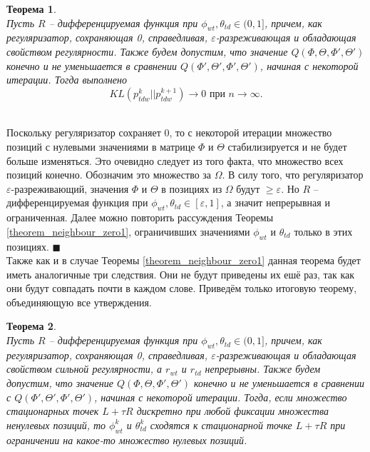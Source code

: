 \documentclass[12pt]{article}
\newtheorem{theorem}{Теорема}
\newenvironment{Proof} 
	{\par\noindent{\bf Доказательство.}} 
	{\hfill$\blacksquare$}
\renewcommand{\geq}{\geqslant}
\begin{document}
\begin{theorem} \label{theorem_neighbour_zero2} \ \\
	Пусть $R$ -- дифференцируемая функция при $\phi_{wt}, \theta_{td} \in (0, 1]$, причем, как регуляризатор, сохраняющая 0, справедливая, $\varepsilon$-разреживающая и обладающая свойством регулярности. Также будем допустим,  что значение $Q(\Phi, \Theta, \Phi', \Theta')$ конечно и не уменьшается в сравнении $Q(\Phi', \Theta', \Phi', \Theta')$, начиная с некоторой итерации. Тогда выполнено
\[
KL(p_{tdw}^{k}||p_{tdw}^{k+1}) \to 0 \text{ при } n \to \infty.
\]
\end{theorem}
\begin{Proof}\ \\
Поскольку регуляризатор сохраняет 0, то с некоторой итерации множество позиций с нулевыми значениями в матрице $\Phi$ и $\Theta$ стабилизируется и не будет больше изменяться. Это очевидно следует из того факта, что  множество всех позиций конечно. Обозначим это множество за $\Omega$. В силу того, что регуляризатор $\varepsilon$-разреживающий, значения $\Phi$ и $\Theta$ в позициях из $\Omega$ будут $\geq \varepsilon$. Но $R$ -- дифференцируемая функция при $\phi_{wt}, \theta_{td} \in [\varepsilon, 1]$, а значит непрерывная и ограниченная. Далее можно повторить рассуждения Теоремы \ref{theorem_neighbour_zero1}, ограничивших значениями $\phi_{wt}$ и $\theta_{td}$ только в этих позициях. 
\end{Proof}\ \\
Также как и в случае Теоремы \ref{theorem_neighbour_zero1} данная теорема будет иметь аналогичные три следствия. Они не будут приведены их ешё раз, так как они будут совпадать почти в каждом слове. Приведём только итоговую теорему, объединяющую все утверждения.
\begin{theorem} \label{theorem_convergence1} \ \\
	Пусть $R$ -- дифференцируемая функция при $\phi_{wt}, \theta_{td} \in (0, 1]$, причем, как регуляризатор, сохраняющая 0, справедливая, $\varepsilon$-разреживающая и обладающая свойством сильной регулярности, а  $r_{wt}$ и $r_{td}$ непрерывны. Также будем допустим,  что значение $Q(\Phi, \Theta, \Phi', \Theta')$ конечно и не уменьшается в сравнении с $Q(\Phi', \Theta', \Phi', \Theta')$, начиная с некоторой итерации. Тогда, если множество стационарных точек $L + \tau R$ дискретно при любой фиксации множества ненулевых позиций, то $\phi_{wt}^{k}$ и $\theta_{td}^{k}$ сходятся к стационарной точке $L + \tau R$ при ограничении на какое-то множество нулевых позиций.
\end{theorem}
\end{document}
